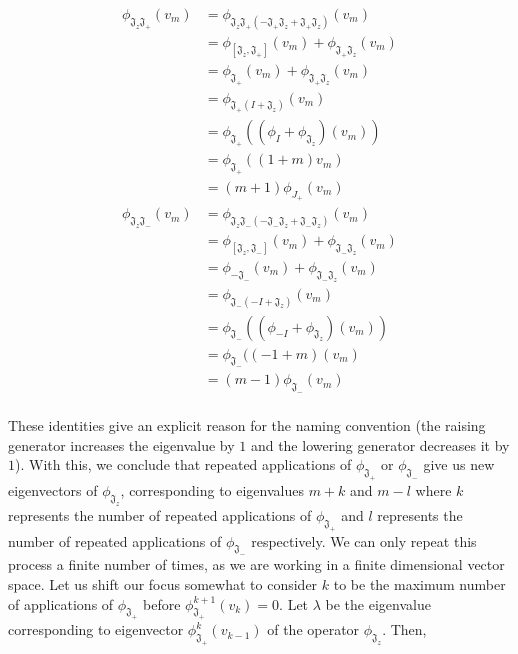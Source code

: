 \begin{equation}
	\begin{aligned}
		\phi_{\mathfrak{J}_z\mathfrak{J}_+}(v_m) &= \phi_{\mathfrak{J}_z\mathfrak{J}_+ (-\mathfrak{J}_+\mathfrak{J}_z + \mathfrak{J}_+\mathfrak{J}_z)}(v_m) \\
					&= \phi_{[\mathfrak{J}_z,\mathfrak{J}_+]}(v_m) + \phi_{\mathfrak{J}_+\mathfrak{J}_z}(v_m) \\
					&= \phi_{\mathfrak{J}_+}(v_m) + \phi_{\mathfrak{J}_+\mathfrak{J}_z}(v_m) \\
					&= \phi_{\mathfrak{J}_+(I + \mathfrak{J}_z)}(v_m) \\					
					&= \phi_{\mathfrak{J}_+}((\phi_{I} + \phi_{\mathfrak{J}_z})(v_m)) \\
					&= \phi_{\mathfrak{J}_+}  ((1+m)v_m) \\
					&= (m + 1)\phi_{J_+}(v_m)
	\end{aligned}
\end{equation} 
\begin{equation}
	\begin{aligned}
		\phi_{\mathfrak{J}_z\mathfrak{J}_-}(v_m) &= \phi_{\mathfrak{J}_z\mathfrak{J}_- (-\mathfrak{J}_-\mathfrak{J}_z + \mathfrak{J}_-\mathfrak{J}_z)}(v_m) \\
&=\phi_{[\mathfrak{J}_z,\mathfrak{J}_- ]}(v_m) + \phi_{\mathfrak{J}_-\mathfrak{J}_z}(v_m)\\
					&= \phi_{-\mathfrak{J}_-}(v_m) + \phi_{\mathfrak{J}_-\mathfrak{J}_z}(v_m)\\
					&= \phi_{\mathfrak{J}_-(-I + \mathfrak{J}_z)}(v_m) \\
					&= \phi_{\mathfrak{J}_-}((\phi_{-I} + \phi_{\mathfrak{J}_z})(v_m)) \\
					&= \phi_{\mathfrak{J}_-} ((-1+m)(v_m) \\
					&= (m - 1)\phi_{\mathfrak{J}_-}(v_m)\\
	\end{aligned}
\end{equation} 

These identities give an explicit reason for the naming convention (the raising generator increases the eigenvalue by $1$ and the lowering generator decreases it by $1$). With this, we conclude that repeated applications of $\phi_{\mathfrak{J}_+}$ or $\phi_{\mathfrak{J}_-}$ give us new eigenvectors of $\phi_{\mathfrak{J}_z}$, corresponding to eigenvalues $m + k$ and $m-l$ where $k$ represents the number of repeated applications of $\phi_{\mathfrak{J}_+}$ and $l$ represents the number of repeated applications of $\phi_{\mathfrak{J}_-}$ respectively. We can only repeat this process a finite number of times, as we are working in a finite dimensional vector space. Let us shift our focus somewhat to consider $k$ to be the maximum number of applications of $\phi_{\mathfrak{J}_+}$ before $\phi_{\mathfrak{J}_+}^{k+1}(v_k) = 0$. Let $\lambda$ be the eigenvalue corresponding to eigenvector $\phi_{\mathfrak{J}_+}^{k}(v_{k-1})$ of the operator $\phi_{\mathfrak{J}_z}$. Then, 


